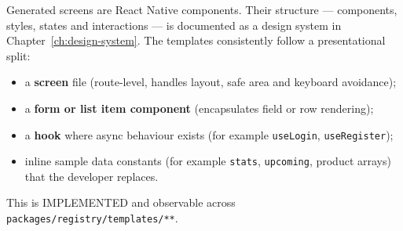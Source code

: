 Generated screens are React Native components. Their structure --- components,
styles, states and interactions --- is documented as a design system in
Chapter~\ref{ch:design-system}. The templates consistently follow a
presentational split:

\begin{itemize}
  \item a \textbf{screen} file (route-level, handles layout, safe area and
        keyboard avoidance);
  \item a \textbf{form or list item component} (encapsulates field or row
        rendering);
  \item a \textbf{hook} where async behaviour exists (for example
        \texttt{useLogin}, \texttt{useRegister});
  \item inline sample data constants (for example \texttt{stats},
        \texttt{upcoming}, product arrays) that the developer replaces.
\end{itemize}

This is IMPLEMENTED and observable across \texttt{packages/registry/templates/**}.
